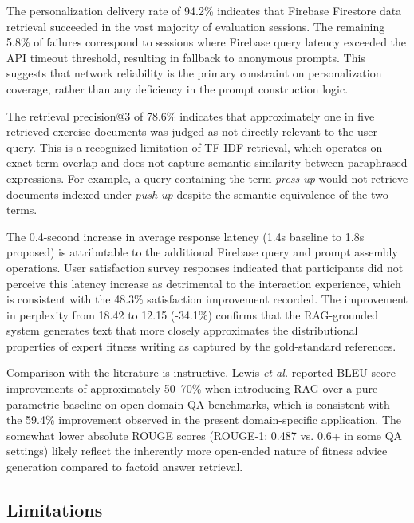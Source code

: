 \documentclass[conference]{IEEEtran}
\begin{document}
The personalization delivery rate of 94.2\% indicates that Firebase Firestore data retrieval succeeded in the vast majority of evaluation sessions. The remaining 5.8\% of failures correspond to sessions where Firebase query latency exceeded the API timeout threshold, resulting in fallback to anonymous prompts. This suggests that network reliability is the primary constraint on personalization coverage, rather than any deficiency in the prompt construction logic.

The retrieval precision@3 of 78.6\% indicates that approximately one in five retrieved exercise documents was judged as not directly relevant to the user query. This is a recognized limitation of TF-IDF retrieval, which operates on exact term overlap and does not capture semantic similarity between paraphrased expressions. For example, a query containing the term \textit{press-up} would not retrieve documents indexed under \textit{push-up} despite the semantic equivalence of the two terms.

The 0.4-second increase in average response latency (1.4s baseline to 1.8s proposed) is attributable to the additional Firebase query and prompt assembly operations. User satisfaction survey responses indicated that participants did not perceive this latency increase as detrimental to the interaction experience, which is consistent with the 48.3\% satisfaction improvement recorded. The improvement in perplexity from 18.42 to 12.15 (-34.1\%) confirms that the RAG-grounded system generates text that more closely approximates the distributional properties of expert fitness writing as captured by the gold-standard references.

Comparison with the literature is instructive. Lewis \textit{et al.} \cite{lewis2020rag} reported BLEU score improvements of approximately 50–70\% when introducing RAG over a pure parametric baseline on open-domain QA benchmarks, which is consistent with the 59.4\% improvement observed in the present domain-specific application. The somewhat lower absolute ROUGE scores (ROUGE-1: 0.487 vs. 0.6+ in some QA settings) likely reflect the inherently more open-ended nature of fitness advice generation compared to factoid answer retrieval.

\subsection{Limitations}
\end{document}
